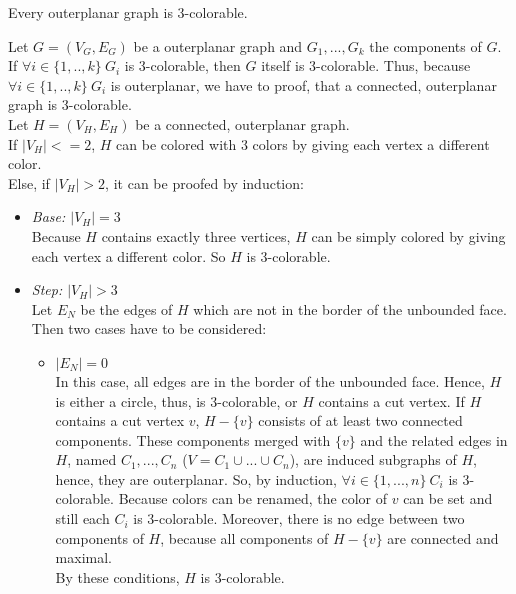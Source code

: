 \documentclass[a4paper]{article}
\begin{document}
	\newpage
	\begin{solution}{24}
		\begin{theorem}{Every outerplanar graph is 3-colorable.}
		
		Let $G=(V_G, E_G)$ be a outerplanar graph and $G_1,...,G_k$ the components of $G$.
		If $\forall i \in \{1,..,k\} ~ G_i$ is 3-colorable, then $G$ itself is 3-colorable.
		Thus, because $\forall i \in \{1,..,k\} ~ G_i$ is outerplanar, we have to proof, that a connected, outerplanar graph is 3-colorable.\\
		
		Let $H=(V_H,E_H)$ be a connected, outerplanar graph.\\
		If $|V_H| <= 2$, $H$ can be colored with $3$ colors by giving each vertex a different color.\\
		Else, if $|V_H| > 2$, it can be proofed by induction:

		\begin{itemize}
			\item {\emph{Base: $|V_H| = 3$}}\\
				Because $H$ contains exactly three vertices, $H$ can be simply colored by giving each vertex a different color. So $H$ is 3-colorable.
				
			\item {\emph{Step: $|V_H| > 3$}}\\
				Let $E_N$ be the edges of $H$ which are not in the border of the unbounded face. Then two cases have to be considered:
				\begin{itemize}
						\item {\emph{$|E_N| = 0$}}\\
							In this case, all edges are in the border of the unbounded face. Hence, $H$ is either a circle, thus, is 3-colorable, or $H$ contains a cut vertex. If $H$ contains a cut vertex $v$, $H-\{v\}$ consists of at least two connected components. These components merged with $\{v\}$ and the related edges in $H$, named $C_1,...,C_n$ ($V=C_1 \cup ... \cup C_n$), are induced subgraphs of $H$, hence, they are outerplanar. So, by induction, $\forall i \in \{1,...,n\} ~ C_i$ is 3-colorable. Because colors can be renamed, the color of $v$ can be set and still each $C_i$ is 3-colorable. Moreover, there is no edge between two components of $H$, because all components of $H-\{v\}$ are connected and maximal.\\
							By these conditions, $H$ is 3-colorable.
							

\end{itemize}
\end{itemize}
\end{theorem}
\end{solution}
\end{document}
